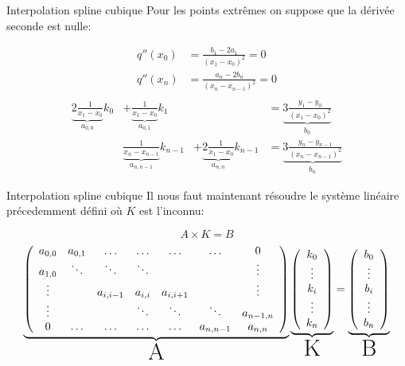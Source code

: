 \documentclass{beamer}
\begin{document}
\begin{frame}{Interpolation spline cubique}
Pour les points extrêmes on suppose que la dérivée seconde est nulle:\\
\begin{overprint}
\begin{align*}
q''(x_0)&=\frac{b_1 -2 a_1}{(x_1-x_0)^2}=0\\
q''(x_n)&=\frac{a_n -2 b_n}{(x_n-x_{n-1})^2}=0\\
\end{align*}
\begin{align*}
\underbrace{2\frac{1}{x_{1}-x_{0}}  }_{a_{0,0}} k_{0}&+\underbrace{\frac{1}{x_{1}-x_{0}}}_{a_{0,1}}k_{1}&&=\underbrace{3\frac{y_{1}-y_{0}}{(x_{1}-x_{0})^2}}_{b_0}\\
&\underbrace{\frac{1}{x_{n}-x_{n-1}}}_{a_{n,n-1}}k_{n-1}&+\underbrace{2\frac{1}{x_{1}-x_{0}}}_{a_{n,n}} k_{n-1} &=\underbrace{3\frac{y_{n}-y_{n-1}}{(x_{n}-x_{n-1})^2}}_{b_n}
\end{align*}
\end{overprint}
\end{frame}
\begin{frame}{Interpolation spline cubique}
Il nous faut maintenant résoudre le système linéaire précedemment défini où $K$ est l'inconnu:\\
\begin{overprint}
\Huge
\[
A \times K = B
\]
\footnotesize
\[
\underbrace{\left( 
\begin{array}{ccccccc}
a_{0,0} & a_{0,1} & \hdots & \hdots & \hdots & \hdots & 0 \\
a_{1,0} & \ddots & \ddots & \ddots  &  &  & \vdots  \\
\vdots & & a_{i,i-1} & a_{i,i} & a_{i,i+1} & & \vdots \\
\vdots & & & \ddots & \ddots & \ddots & a_{n-1,n}\\
0 & \hdots & \hdots & \hdots & \hdots & a_{n,n-1} & a_{n,n} 
\end{array}
\right)}_{\text{\huge A}}
\underbrace{\left(
\begin{array}{c}
k_0\\
\vdots\\
k_i\\
\vdots\\
k_n\\
\end{array}
\right)}_{\text{\huge K}}
=
\underbrace{\left(
\begin{array}{c}
b_0\\
\vdots\\
b_i\\
\vdots\\
b_n\\
\end{array}
\right)}_{\text{\huge B}}
\]
\end{overprint}
\end{frame}
\end{document}
